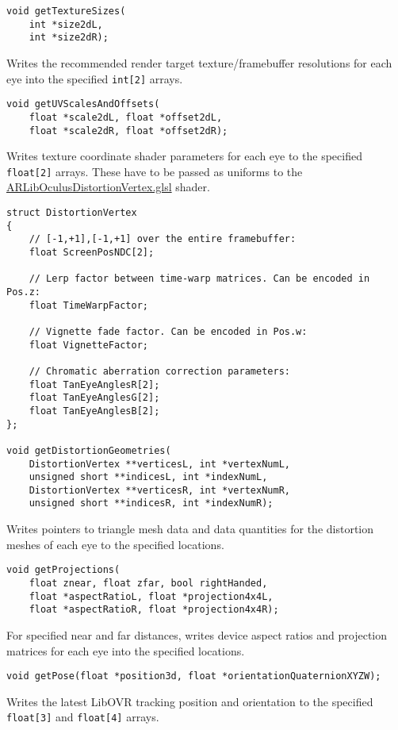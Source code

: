 \begin{lstlisting}
void getTextureSizes(
    int *size2dL,
    int *size2dR);
\end{lstlisting}
Writes the recommended render target texture/framebuffer resolutions for each eye into the specified \texttt{int{[}2{]}} arrays.

\begin{lstlisting}
void getUVScalesAndOffsets(
    float *scale2dL, float *offset2dL,
    float *scale2dR, float *offset2dR);
\end{lstlisting}
Writes texture coordinate shader parameters for each eye to the specified \texttt{float{[}2{]}} arrays.
These have to be passed as uniforms to the \href{https://github.com/ands/OculusMeetsAR/blob/master/ARLib/ogre_media/ARLibOculusDistortionVertex.glsl}{ARLibOculusDistortionVertex.glsl} shader.

\begin{lstlisting}
struct DistortionVertex
{
    // [-1,+1],[-1,+1] over the entire framebuffer:
    float ScreenPosNDC[2];

    // Lerp factor between time-warp matrices. Can be encoded in Pos.z:
    float TimeWarpFactor; 

    // Vignette fade factor. Can be encoded in Pos.w:
    float VignetteFactor;

    // Chromatic aberration correction parameters:
    float TanEyeAnglesR[2];
    float TanEyeAnglesG[2];
    float TanEyeAnglesB[2];
};

void getDistortionGeometries(
    DistortionVertex **verticesL, int *vertexNumL,
    unsigned short **indicesL, int *indexNumL,
    DistortionVertex **verticesR, int *vertexNumR,
    unsigned short **indicesR, int *indexNumR);
\end{lstlisting}
Writes pointers to triangle mesh data and data quantities for the distortion meshes of each eye to the specified locations.

\begin{lstlisting}
void getProjections(
    float znear, float zfar, bool rightHanded,
    float *aspectRatioL, float *projection4x4L,
    float *aspectRatioR, float *projection4x4R);
\end{lstlisting}
For specified near and far distances, writes device aspect ratios and projection matrices for each eye into the specified locations.

\begin{lstlisting}
void getPose(float *position3d, float *orientationQuaternionXYZW);
\end{lstlisting}
Writes the latest LibOVR tracking position and orientation to the specified \texttt{float{[}3{]}} and \texttt{float{[}4{]}} arrays.

